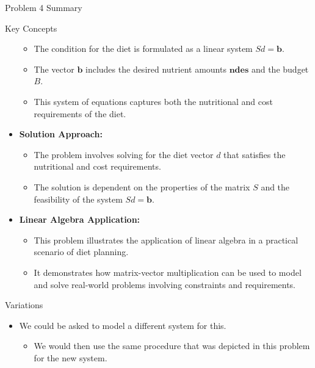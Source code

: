 \begin{summary}{Problem 4 Summary}
\begin{statement}{Key Concepts}
\begin{itemize}
\begin{itemize}
                \item The condition for the diet is formulated as a linear system $Sd = \mathbf{b}$.
                \item The vector $\mathbf{b}$ includes the desired nutrient amounts $\mathbf{ndes}$ and the budget $B$.
                \item This system of equations captures both the nutritional and cost requirements of the diet.
            \end{itemize}
            \item \textbf{Solution Approach:}
            \begin{itemize}
                \item The problem involves solving for the diet vector $d$ that satisfies the nutritional and cost requirements.
                \item The solution is dependent on the properties of the matrix $S$ and the feasibility of the system $Sd = \mathbf{b}$.
            \end{itemize}
            \item \textbf{Linear Algebra Application:}
            \begin{itemize}
                \item This problem illustrates the application of linear algebra in a practical scenario of diet planning.
                \item It demonstrates how matrix-vector multiplication can be used to model and solve real-world problems involving constraints and requirements.
            \end{itemize}
        \end{itemize}
    \end{statement}
    \begin{statement}{Variations}
        \begin{itemize}
            \item We could be asked to model a different system for this.
            \begin{itemize}
                \item We would then use the same procedure that was depicted in this problem for the new system.
            \end{itemize}
        \end{itemize}
    \end{statement}
\end{summary}
